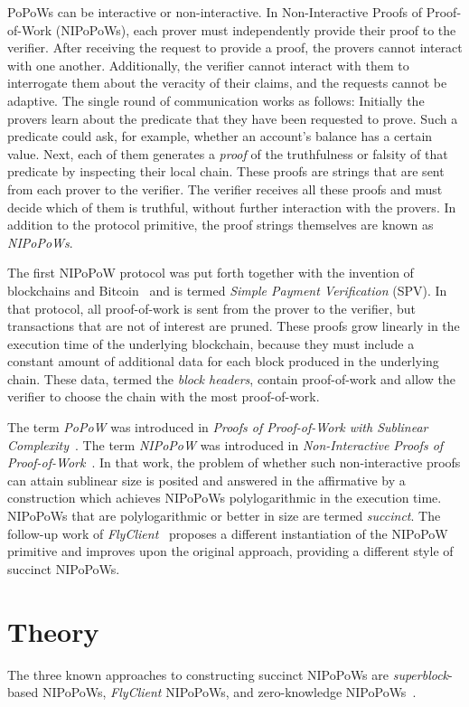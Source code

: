 \documentclass[runningheads]{format/llncs}
\begin{document}
PoPoWs can be interactive or non-interactive. In Non-Interactive Proofs of Proof-of-Work (NIPoPoWs), each prover must independently provide their proof to the verifier. After receiving the request to provide a proof, the provers cannot interact with one another. Additionally, the verifier cannot interact with them to interrogate them about the veracity of their claims, and the requests cannot be adaptive. The single round of communication works as follows: Initially the provers learn about the predicate that they have been requested to prove. Such a predicate could ask, for example, whether an account's balance has a certain value. Next, each of them generates a \emph{proof} of the truthfulness or falsity of that predicate by inspecting their local chain. These proofs are strings that are sent from each prover to the verifier. The verifier receives all these proofs and must decide which of them is truthful, without further interaction with the provers. In addition to the protocol primitive, the proof strings themselves are known as \emph{NIPoPoWs}.

The first NIPoPoW protocol was put forth together with the invention of blockchains and Bitcoin~\cite{bitcoin} and is termed \emph{Simple Payment Verification} (SPV). In that protocol, all proof-of-work is sent from the prover to the verifier, but transactions that are not of interest are pruned. These proofs grow linearly in the execution time of the underlying blockchain, because they must include a constant amount of additional data for each block produced in the underlying chain. These data, termed the \emph{block headers}, contain proof-of-work and allow the verifier to choose the chain with the most proof-of-work.

The term \emph{PoPoW} was introduced in \emph{Proofs of Proof-of-Work with Sublinear Complexity}~\cite{popows}. The term \emph{NIPoPoW} was introduced in \emph{Non-Interactive Proofs of Proof-of-Work}~\cite{nipopows}. In that work, the problem of whether such non-interactive proofs can attain sublinear size is posited and answered in the affirmative by a construction which achieves NIPoPoWs polylogarithmic in the execution time. NIPoPoWs that are polylogarithmic or better in size are termed \emph{succinct}. The follow-up work of \emph{FlyClient}~\cite{flyclient} proposes a different instantiation of the NIPoPoW primitive and improves upon the original approach, providing a different style of succinct NIPoPoWs.

\section*{Theory}
The three known approaches to constructing succinct NIPoPoWs are \emph{superblock}-based NIPoPoWs, \emph{FlyClient} NIPoPoWs, and zero-knowledge NIPoPoWs~\cite{coda,plumo}.
\end{document}
